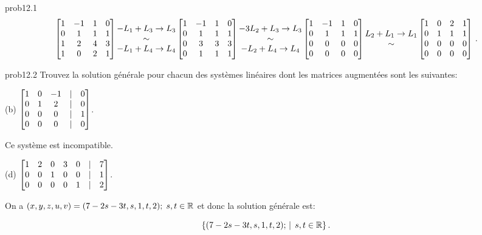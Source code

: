 \begin{sol}{prob12.1}
\soln
$$\bmatrix 
1 & -1 & 1 & 0 \\
 0 & 1 & 1 & 1 \\
 1 & 2 & 4 & 3 \\
 1 & 0 & 2 & 1\endbmatrix \begin{matrix} -L_1+L_3\to L_3 \\ \sim \\-L_1+L_4\to L_4 \end{matrix} 
\bmatrix 
1 & -1 & 1 & 0 \\
 0 & 1 & 1 & 1 \\
 0 & 3 & 3 & 3 \\
 0 & 1 & 1 & 1\endbmatrix
\begin{matrix} -3L_2+L_3\to L_3 \\ \sim \\-L_2+L_4\to L_4 \end{matrix}\bmatrix  1 & -1 & 1 & 0 \\
 0 & 1 & 1 & 1 \\
 0 & 0 & 0 & 0 \\
 0 & 0 & 0 & 0 \endbmatrix
\begin{matrix} L_2+L_1\to L_1 \\ \sim \\
 \end{matrix}\bmatrix  1 & 0 & 2 & 1 \\
 0 & 1 & 1 & 1 \\
 0 & 0 & 0 & 0 \\
 0 & 0 & 0 & 0 \endbmatrix\,.$$
\medskip 


\end{sol}

\bigskip
\begin{sol}{prob12.2} Trouvez la solution générale pour chacun des systèmes linéaires dont les matrices augmentées sont les suivantes:
\medskip

(b) $ \bmatrix 1 & 0 & -1 &|&0 \\
 0 & 1 & 2 &|&0\\
 0 & 0 & 0&|&1 \\
 0 & 0 & 0 &|&0\endbmatrix$.

\soln Ce système est incompatible.
\medskip
 

(d) $\bmatrix  1 & 2 & 0 & 3 & 0 &|& 7 \\
 0 & 0 & 1 & 0 & 0 &|& 1 \\
 0 & 0 & 0 & 0 & 1 &|& 2 \endbmatrix$.

\soln On a $(x,y,z,u,v)=(7-2s-3t,s,1,t,2); \; s,t \in \mathbb{R}$ et donc la solution g\'en\'erale est:

$$ \{(7-2s-3t,s,1,t,2); \, \mid \, s,t \in \mathbb{R}\}\,. $$
\medskip



\end{sol}
